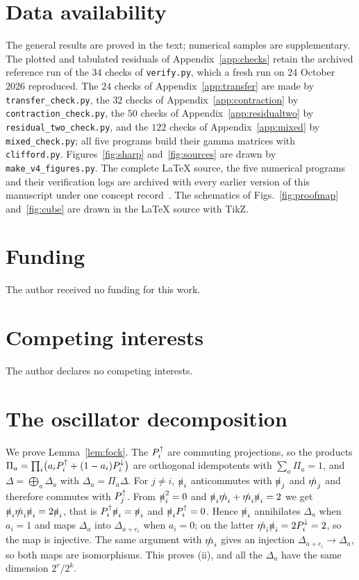 \section*{Data availability}

The general results are proved in the text; numerical samples are supplementary. The plotted and tabulated residuals of Appendix~\ref{app:checks} retain the archived reference run of the $34$ checks of \texttt{verify.py}, which a fresh run on 24 October 2026 reproduced. The $24$ checks of Appendix~\ref{app:transfer} are made by \texttt{transfer\_check.py}, the $32$ checks of Appendix~\ref{app:contraction} by \texttt{contraction\_check.py}, the $50$ checks of Appendix~\ref{app:residualtwo} by \texttt{residual\_two\_check.py}, and the $122$ checks of Appendix~\ref{app:mixed} by \texttt{mixed\_check.py}; all five programs build their gamma matrices with \texttt{clifford.py}. Figures~\ref{fig:sharp} and~\ref{fig:sources} are drawn by \texttt{make\_v4\_figures.py}. The complete \LaTeX{} source, the five numerical programs and their verification logs are archived with every earlier version of this manuscript under one concept record~\cite{Paper4Release}. The schematics of Figs.~\ref{fig:proofmap} and~\ref{fig:cube} are drawn in the \LaTeX{} source with TikZ.

\section*{Funding}

The author received no funding for this work.

\section*{Competing interests}

The author declares no competing interests.

\appendix
{}
\renewcommand{\thefigure}{\Alph{section}.\arabic{figure}}
\renewcommand{\thetable}{\Alph{section}.\arabic{table}}
\renewcommand{\theequation}{\Alph{section}.\arabic{equation}}

\section{The oscillator decomposition}
\label{app:fock}

We prove Lemma~\ref{lem:fock}. The $P^{\uparrow}_i$ are commuting projections, so the products $\Pi_a=\prod_i\bigl(a_iP^{\uparrow}_i+(1-a_i)P^{\downarrow}_i\bigr)$ are orthogonal idempotents with $\sum_a\Pi_a=1$, and $\Delta=\bigoplus_a\Delta_a$ with $\Delta_a=\Pi_a\Delta$. For $j\ne i$, $\slashed{n}_i$ anticommutes with $\slashed{n}_j$ and $\slashed{m}_j$ and therefore commutes with $P^{\uparrow}_j$. From $\slashed{n}_i^2=0$ and $\slashed{n}_i\slashed{m}_i+\slashed{m}_i\slashed{n}_i=2$ we get $\slashed{n}_i\slashed{m}_i\slashed{n}_i=2\slashed{n}_i$, that is $P^{\uparrow}_i\slashed{n}_i=\slashed{n}_i$ and $\slashed{n}_iP^{\uparrow}_i=0$. Hence $\slashed{n}_i$ annihilates $\Delta_a$ when $a_i=1$ and maps $\Delta_a$ into $\Delta_{a+e_i}$ when $a_i=0$; on the latter $\slashed{m}_i\slashed{n}_i=2P^{\downarrow}_i=2$, so the map is injective. The same argument with $\slashed{m}_i$ gives an injection $\Delta_{a+e_i}\to\Delta_a$, so both maps are isomorphisms. This proves (ii), and all the $\Delta_a$ have the same dimension $2^r/2^k$.

